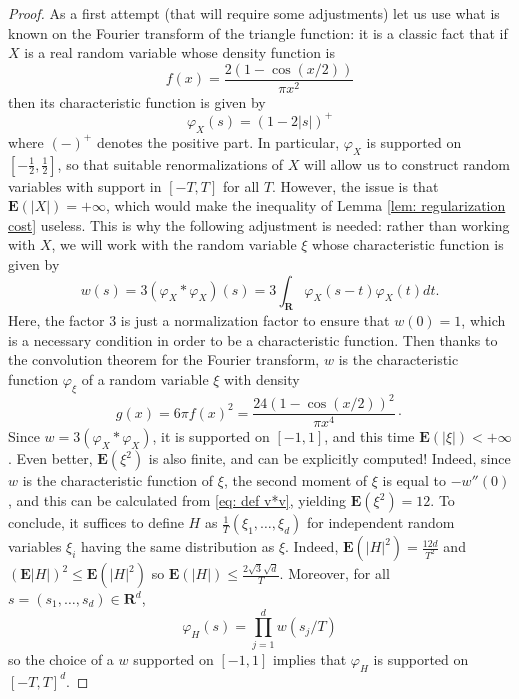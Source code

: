 \documentclass[12pt]{amsart}
\newcommand{\Rr}{\mathbf{R}}
\newcommand{\expect}{\mathbf{E}}
\theoremstyle{plain}
\theoremstyle{remark}
\theoremstyle{definition}
\begin{document}
\begin{proof}
  As a first attempt (that will require some adjustments) let us use
  what is known on the Fourier transform of the triangle function: it
  is a classic fact that if $X$ is a real random variable whose
  density function is
  $$
  f(x) = \frac{2(1 - \cos(x/2))}{\pi x^2}
  $$
  then its characteristic function is given by
  $$
  \varphi_X(s) = (1 - 2 |s|)^{+}
  $$
  where $(-)^{+}$ denotes the positive part. In particular,
  $\varphi_X$ is supported on $\left[ -\frac12, \frac12 \right]$, so
  that suitable renormalizations of $X$ will allow us to construct
  random variables with support in $[-T, T]$ for all $T$. However, the
  issue is that $\expect(|X|) = + \infty$, which would make the
  inequality of Lemma \ref{lem: regularization cost} useless. This is
  why the following adjustment is needed: rather than working with
  $X$, we will work with the random variable $\xi$ whose
  characteristic function is given by
  \begin{equation} \label{eq: def v*v}
    w(s) = 3 (\varphi_X * \varphi_X) (s) = 3 \int_{\Rr} \varphi_X(s-t)\varphi_X(t) dt.
  \end{equation}
  Here, the factor $3$ is just a normalization factor to ensure that
  $w(0) = 1$, which is a necessary condition in order to be a
  characteristic function. Then thanks to the convolution theorem for
  the Fourier transform, $w$ is the characteristic function
  $\varphi_\xi$ of a random variable $\xi$ with density
  $$
  g(x) =6 \pi f(x)^2 = \frac{24 (1 - \cos(x/2))^2}{\pi x^4}\cdot
  $$
  Since $w = 3(\varphi_X * \varphi_X)$, it is supported on $[-1,1]$,
  and this time $\expect(|\xi|) < + \infty$. Even better,
  $\expect(\xi^2)$ is also finite, and can be explicitly computed!
  Indeed, since $w$ is the characteristic function of $\xi$, the
  second moment of $\xi$ is equal to $-w''(0)$, and this can be
  calculated from \eqref{eq: def v*v}, yielding $\expect(\xi^2) =
  12$. To conclude, it suffices to define $H$ as
  $\frac{1}{T}(\xi_1, \dots, \xi_d)$ for independent random variables
  $\xi_i$ having the same distribution as $\xi$. Indeed,
  $\expect(|H|^2) = \frac{12d}{T^2}$ and
  $(\expect|H|)^2 \leqslant \expect(|H|^2)$ so
  $\expect(|H|) \leqslant \frac{2 \sqrt{3}\sqrt{d}}{T}$. Moreover, for all
  $s =(s_1, \dots, s_d) \in \Rr^d$,
  $$
  \varphi_H(s) = \prod_{j = 1}^{d} w(s_j / T)
  $$
  so the choice of a $w$ supported on $[-1, 1]$ implies that
  $\varphi_H$ is supported on $[-T,T]^d$.
\end{proof}
\end{document}
